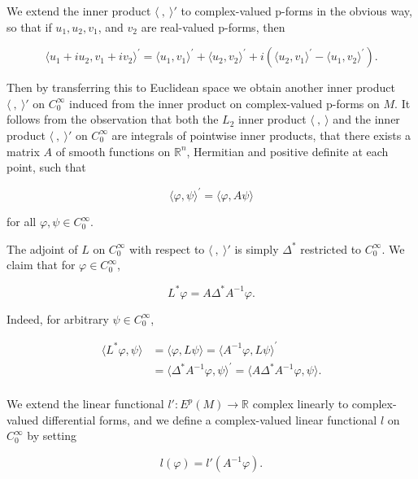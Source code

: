 We extend the inner product $\langle\ ,\ \rangle'$ to complex-valued p-forms in the obvious way, so that if  $ u_{1}, u_{2}, v_{1} $, and  $ v_{2} $ are real-valued p-forms, then

\[
\langle u_{1}+i u_{2},v_{1}+i v_{2}\rangle^{\prime}=\langle u_{1},v_{1}\rangle^{\prime}+\langle u_{2},v_{2}\rangle^{\prime}+i(\langle u_{2},v_{1}\rangle^{\prime}-\langle u_{1},v_{2}\rangle^{\prime}).
\]

Then by transferring this to Euclidean space we obtain another inner product $\langle\ ,\ \rangle'$ on $C_{0}^{\infty}$ induced from the inner product on complex-valued p-forms on $M$. It follows from the observation that both the $L_{2}$ inner product $\langle\ ,\ \rangle$ and the inner product $\langle\ ,\ \rangle'$ on $C_{0}^{\infty}$ are integrals of pointwise inner products, that there exists a matrix $A$ of smooth functions on $\mathbb{R}^{n}$, Hermitian and positive definite at each point, such that

\begin{equation}
\tag{2}\label{eq:6.32:2}
\langle\varphi,\psi\rangle^{\prime}=\langle\varphi,A\psi\rangle
\end{equation}

for all  $ \varphi, \psi \in C_0^\infty $.

The adjoint of $L$ on $C_0^\infty$ with respect to $\langle\ ,\ \rangle'$ is simply $\Delta^*$ restricted to $C_0^\infty$. We claim that for $\varphi \in C_0^\infty$,

\begin{equation}
\tag{3}\label{eq:6.32:3}
L^{*}\varphi=A\Delta^{*}A^{-1}\varphi.
\end{equation}

Indeed, for arbitrary  $ \psi \in C_{0}^{\infty} $,

\[
\begin{aligned}{\langle L^{*}\varphi,\psi\rangle}&{{}=\langle\varphi,L\psi\rangle=\langle A^{-1}\varphi,L\psi\rangle^{\prime}}\\ {}&{{}=\langle\Delta^{*}A^{-1}\varphi,\psi\rangle^{\prime}=\langle A\Delta^{*}A^{-1}\varphi,\psi\rangle.}\\ \end{aligned}
\]

We extend the linear functional $l': E^p(M) \to \mathbb{R}$ complex linearly to complex-valued differential forms, and we define a complex-valued linear functional $l$ on $C_0^\infty$ by setting

\begin{equation}
\tag{4}\label{eq:6.32:4}
l(\varphi)=l'(A^{-1}\varphi).
\end{equation}


